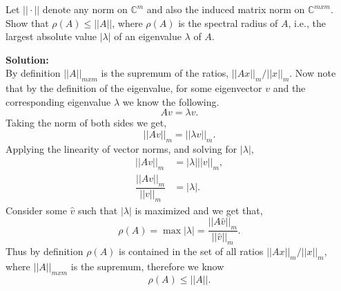 \documentclass[12pt]{article}
\makeatletter
\theoremstyle{homework}
\newenvironment{exercise}[1]
{\def\@currentlabel{#1}\exercisecore}
{\endexercisecore}
\newcommand{\localhead}[1]{\par\smallskip\noindent\textbf{#1}\nobreak\\}%
\newcommand\solution{\localhead{Solution:}}
\newcommand{\Cplx}{\ensuremath{\mathbb C}}
\let\CC\Cplx
\makeatother
\begin{document}
\begin{exercise}{3.2} Let $||\cdot||$ denote any norm on $\CC^m$ and also the induced matrix norm on $\CC^{mxm}$. 
  Show that $\rho(A) \leq ||A||$, where $\rho(A)$ is the spectral radius of $A$, i.e., the largest absolute value 
  $|\lambda|$ of an eigenvalue $\lambda$ of $A$.\\

  \solution By definition $||A||_{mxm}$ is the supremum of the ratios, $||Ax||_{m}/||x||_{m}$. Now note that by the definition of the eigenvalue,
  for some eigenvector $v$ and the corresponding eigenvalue $\lambda$ we know the following. 
  \begin{equation*}
    Av = \lambda v.
  \end{equation*}
  Taking the norm of both sides we get, 
  \begin{equation*}
    ||Av||_{m}=||\lambda v||_{m}.
  \end{equation*}
  Applying the linearity of vector norms, and solving for $|\lambda|$,
  \begin{align*}
    ||Av||_{m}&=|\lambda |||v||_{m},\\
    \dfrac{||Av||_{m}}{||v||_{m}}&=|\lambda|.
  \end{align*}
  Consider some $\hat{v}$ such that $|\lambda|$ is maximized and we get that, 
  \begin{equation*}
    \rho(A) = \max |\lambda| = \dfrac{||A\hat{v}||_{m}}{||\hat{v}||_{m}}.
  \end{equation*}
  Thus by definition $\rho(A)$ is contained in the set of all ratios $||Ax||_{m}/||x||_{m}$, where 
  $||A||_{mxm}$ is the supremum, therefore we know
  \begin{equation*}
  \rho(A) \leq ||A||.
  \end{equation*}
\end{exercise}
\vspace{.25in}
\end{document}
